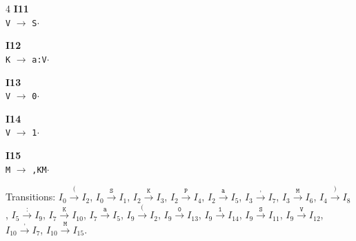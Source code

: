 \documentclass[11pt]{article}
\begin{document}
\begin{multicols}{4}
\smallskip
\noindent\textbf{I11}\\\texttt{V} $\to$ \texttt{S$\cdot$}

\smallskip
\noindent\textbf{I12}\\\texttt{K} $\to$ \texttt{a:V$\cdot$}

\smallskip
\noindent\textbf{I13}\\\texttt{V} $\to$ \texttt{0$\cdot$}

\smallskip
\noindent\textbf{I14}\\\texttt{V} $\to$ \texttt{1$\cdot$}

\smallskip
\noindent\textbf{I15}\\\texttt{M} $\to$ \texttt{,{}KM$\cdot$}
\end{multicols}

\noindent Transitions: {\small $I_{0}\xrightarrow{\texttt{(}}I_{2}$, $I_{0}\xrightarrow{\texttt{S}}I_{1}$, $I_{2}\xrightarrow{\texttt{K}}I_{3}$, $I_{2}\xrightarrow{\texttt{P}}I_{4}$, $I_{2}\xrightarrow{\texttt{a}}I_{5}$, $I_{3}\xrightarrow{\texttt{,{}}}I_{7}$, $I_{3}\xrightarrow{\texttt{M}}I_{6}$, $I_{4}\xrightarrow{\texttt{)}}I_{8}$, $I_{5}\xrightarrow{\texttt{:}}I_{9}$, $I_{7}\xrightarrow{\texttt{K}}I_{10}$, $I_{7}\xrightarrow{\texttt{a}}I_{5}$, $I_{9}\xrightarrow{\texttt{(}}I_{2}$, $I_{9}\xrightarrow{\texttt{0}}I_{13}$, $I_{9}\xrightarrow{\texttt{1}}I_{14}$, $I_{9}\xrightarrow{\texttt{S}}I_{11}$, $I_{9}\xrightarrow{\texttt{V}}I_{12}$, $I_{10}\xrightarrow{\texttt{,{}}}I_{7}$, $I_{10}\xrightarrow{\texttt{M}}I_{15}$.}
\end{document}
